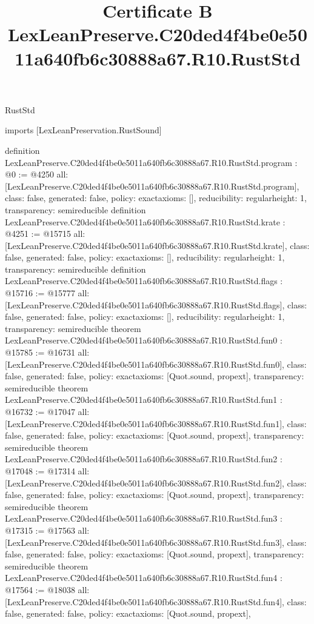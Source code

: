 \begin{lexlean}{RustStd}
\title{Certificate B LexLeanPreserve.C20ded4f4be0e5011a640fb6c30888a67.R10.RustStd}
\begin{coremodule}
imports [LexLeanPreservation.RustSound]

definition LexLeanPreserve.C20ded4f4be0e5011a640fb6c30888a67.R10.RustStd.program : @0 := @4250 {
  all: [LexLeanPreserve.C20ded4f4be0e5011a640fb6c30888a67.R10.RustStd.program],
  class: false,
  generated: false,
  policy: exact{axioms: []},
  reducibility: regular{height: 1},
  transparency: semireducible
}
definition LexLeanPreserve.C20ded4f4be0e5011a640fb6c30888a67.R10.RustStd.krate : @4251 := @15715 {
  all: [LexLeanPreserve.C20ded4f4be0e5011a640fb6c30888a67.R10.RustStd.krate],
  class: false,
  generated: false,
  policy: exact{axioms: []},
  reducibility: regular{height: 1},
  transparency: semireducible
}
definition LexLeanPreserve.C20ded4f4be0e5011a640fb6c30888a67.R10.RustStd.flags : @15716 := @15777 {
  all: [LexLeanPreserve.C20ded4f4be0e5011a640fb6c30888a67.R10.RustStd.flags],
  class: false,
  generated: false,
  policy: exact{axioms: []},
  reducibility: regular{height: 1},
  transparency: semireducible
}
theorem LexLeanPreserve.C20ded4f4be0e5011a640fb6c30888a67.R10.RustStd.fun0 : @15785 := @16731 {
  all: [LexLeanPreserve.C20ded4f4be0e5011a640fb6c30888a67.R10.RustStd.fun0],
  class: false,
  generated: false,
  policy: exact{axioms: [Quot.sound, propext]},
  transparency: semireducible
}
theorem LexLeanPreserve.C20ded4f4be0e5011a640fb6c30888a67.R10.RustStd.fun1 : @16732 := @17047 {
  all: [LexLeanPreserve.C20ded4f4be0e5011a640fb6c30888a67.R10.RustStd.fun1],
  class: false,
  generated: false,
  policy: exact{axioms: [Quot.sound, propext]},
  transparency: semireducible
}
theorem LexLeanPreserve.C20ded4f4be0e5011a640fb6c30888a67.R10.RustStd.fun2 : @17048 := @17314 {
  all: [LexLeanPreserve.C20ded4f4be0e5011a640fb6c30888a67.R10.RustStd.fun2],
  class: false,
  generated: false,
  policy: exact{axioms: [Quot.sound, propext]},
  transparency: semireducible
}
theorem LexLeanPreserve.C20ded4f4be0e5011a640fb6c30888a67.R10.RustStd.fun3 : @17315 := @17563 {
  all: [LexLeanPreserve.C20ded4f4be0e5011a640fb6c30888a67.R10.RustStd.fun3],
  class: false,
  generated: false,
  policy: exact{axioms: [Quot.sound, propext]},
  transparency: semireducible
}
theorem LexLeanPreserve.C20ded4f4be0e5011a640fb6c30888a67.R10.RustStd.fun4 : @17564 := @18038 {
  all: [LexLeanPreserve.C20ded4f4be0e5011a640fb6c30888a67.R10.RustStd.fun4],
  class: false,
  generated: false,
  policy: exact{axioms: [Quot.sound, propext]},
}
\end{coremodule}
\end{lexlean}
